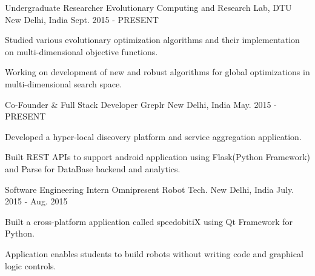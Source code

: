 \begin{cventries}
  \cventry
    {Undergraduate Researcher}
    {Evolutionary Computing and Research Lab, DTU}
    {New Delhi, India}
    {Sept. 2015 - PRESENT}
    {
      \begin{cvitems}
        \item {Studied various evolutionary optimization algorithms and their implementation on multi-dimensional objective functions.}
        \item {Working on development of new and robust algorithms for global optimizations in multi-dimensional search space.}
      \end{cvitems}
    }
  \cventry
    {Co-Founder \& Full Stack Developer}
    {Greplr}
    {New Delhi, India}
    {May. 2015 - PRESENT}
    {
      \begin{cvitems}
        \item {Developed a hyper-local discovery platform and service aggregation application.}
        \item {Built REST APIs to support android application using Flask(Python Framework) and Parse for DataBase backend and analytics.}
      \end{cvitems}
    }
  \cventry
    {Software Engineering Intern}
    {Omnipresent Robot Tech.}
    {New Delhi, India}
    {July. 2015 - Aug. 2015}
    {
      \begin{cvitems}
        \item {Built a cross-platform application called speedobitiX using Qt Framework for Python.}
        \item {Application enables students to build robots without writing code and graphical logic controls.}
      \end{cvitems} 
    }
\end{cventries}
